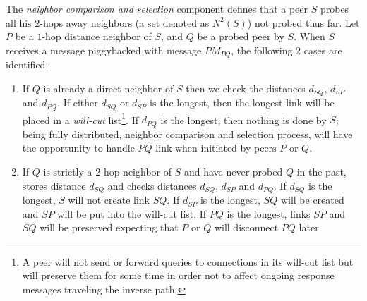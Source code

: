 The \emph{neighbor comparison and selection} component defines that a peer $S$
probes all his $2$-hops away neighbors (a set denoted as $ N^2(S)$) not probed
thus far. Let $P$ be a $1$-hop distance neighbor of $S$, and $Q$ be a probed
peer by $S$. When $S$ receives a message piggybacked with message $PM_{PQ}$, 
the following $2$ cases are identified:

\begin{enumerate}
  \item If $Q$ is already a direct neighbor of $S$ then we check 
	the distances $d_{SQ}$, $d_{SP}$ and $d_{PQ}$. 
	If either $d_{SQ}$ or $d_{SP}$ is the longest, then the longest
  	link will be placed in a \emph{will-cut} list\footnote{A peer will not send or
  	forward queries to connections in its will-cut list but will preserve them
  	for some time in order not to affect ongoing response messages traveling the
  	inverse path.}. 
	If $d_{PQ}$ is the longest, then nothing is done by $S$; being
  	fully distributed, neighbor comparison and selection process, will have the
  	opportunity to handle $PQ$ link when initiated by peers $P$ or $Q$.

  \item If $Q$ is strictly a $2$-hop neighbor of $S$ and have never probed $Q$
  	in the past, stores distance $d_{SQ}$ and checks 
	distances $d_{SQ}$, $d_{SP}$ and $d_{PQ}$.
  	If $d_{SQ}$ is the longest, $S$ will not create link $SQ$. If $d_{SP}$ is the
  	longest, $SQ$ will be created and $SP$ will be put into the will-cut list.
  	If $PQ$ is the longest, links $SP$ and $SQ$ will be preserved expecting that
  	$P$ or $Q$ will disconnect $PQ$ later.
\end{enumerate}

